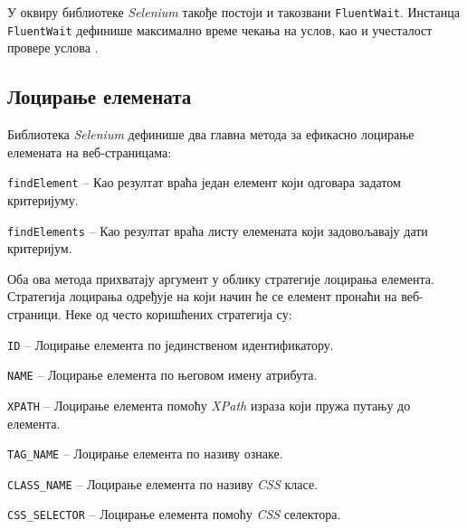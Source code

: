 \documentclass[12pt,oneside]{memoir}
\begin{document}
У оквиру библиотеке \textit{Selenium} такође постоји и такозвани \texttt{FluentWait}. Инстанца \texttt{FluentWait} дефинише максимално време чекања на услов, као и учесталост провере услова \cite{selenium}.

\subsection{Лоцирање елемената}
Библиотека \textit{Selenium} дефинише два главна метода за ефикасно лоцирање елемената на веб-страницама:
\begin{description} 
    \item \texttt{findElement} -- Као резултат враћа један елемент који одговара задатом критеријуму.
    \item \texttt{findElements} -- Као резултат враћа листу елемената који задовољавају дати критеријум.
\end{description}

Оба ова метода прихватају аргумент у облику стратегије лоцирања елемента. Стратегија лоцирања одређује на који начин ће се елемент пронаћи на веб-страници. Неке од често коришћених стратегија су: 
\begin{description} 
    \item \texttt{ID} -- Лоцирање елемента по јединственом идентификатору.
    \item \texttt{NAME} -- Лоцирање елемента по његовом имену атрибута.
    \item \texttt{XPATH} -- Лоцирање елемента помоћу \textit{XPath} израза који пружа путању до елемента.
    \item \texttt{TAG\_NAME} -- Лоцирање елемента по називу ознаке.
    \item \texttt{CLASS\_NAME} -- Лоцирање елемента по називу \textit{CSS} класе.
    \item \texttt{CSS\_SELECTOR} -- Лоцирање елемента помоћу \textit{CSS} селектора.
\end{description}
\end{document}
